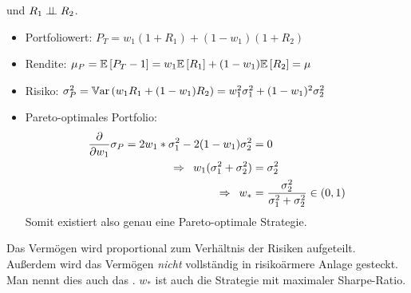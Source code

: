 \begin{description}
	und $R_1 \upmodels R_2$. 
	\begin{itemize}
		\item Portfoliowert: $P_T = w_1 (1+R_1) + (1-w_1)(1+R_2)$
		\item Rendite: $\mu_P = \EW[P_T - 1] = w_1 \EW[R_1] + (1-w_1) \EW[R_2] = \mu$
		\item Risiko: $\sigma_P^2 = \Var[w_1 R_1 + (1-w_1) R_2] = w_1^2 \sigma_1^2 + (1-w_1)^2 \sigma_2^2$
		\item Pareto-optimales Portfolio:
		\begin{equation*}
			\begin{aligned}
			\partdiff{w_1} \sigma_P = 2w_1 * \sigma_1^2 - 2(1-w_1)\sigma_2^2 &= 0 \\
			\follows w_1 ( \sigma_1^2 + \sigma_2^2) &= \sigma_2^2 \\
			\follows w_\ast &= \frac{\sigma_2^2}{\sigma_1^2 + \sigma_2^2} \in (0,1)
			\end{aligned}
		\end{equation*}
		Somit existiert also genau eine Pareto-optimale Strategie.
	\end{itemize}
	Das Vermögen wird proportional zum Verhältnis der Risiken aufgeteilt. Außerdem wird das Vermögen \textit{nicht} vollständig in risikoärmere Anlage gesteckt. Man nennt dies auch das . $w_\ast$ ist auch die Strategie mit maximaler Sharpe-Ratio.
\end{description}